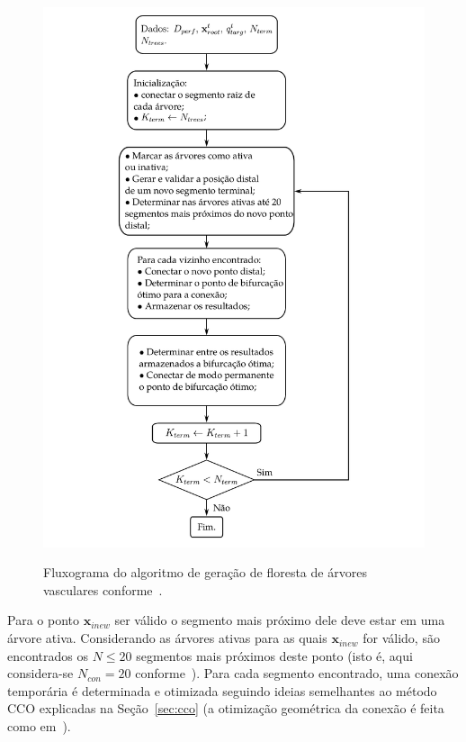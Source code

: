 \begin{figure}
  \centering
  \caption{Fluxograma do algoritmo de gera\c{c}ão de floresta de árvores vasculares conforme~\cite{Jaquet2019}.}
  \includegraphics[scale=0.75]{figuras/modelos-computacionais-de-arvores-circulatorias/fluxograma-algoritmo-jaquet.pdf}
  \label{algo:CCOFlorestaDeArvores}
\end{figure}

Para o ponto $\mathbf{x}_{inew}$ ser válido o segmento mais próximo dele deve estar em uma 
árvore ativa. Considerando as árvores ativas para as quais $\mathbf{x}_{inew}$ for válido, 
são encontrados os $N \leq 20$ segmentos mais próximos deste ponto (isto é, aqui considera-se 
$N_{con} = 20$ conforme~\cite{Karch1999}). Para cada segmento encontrado, 
uma conexão temporária é determinada e otimizada 
seguindo ideias semelhantes ao método CCO explicadas na Seção~\ref{sec:cco}
(a otimização geométrica da conexão é feita como em~\cite{Kamiya1972}).

